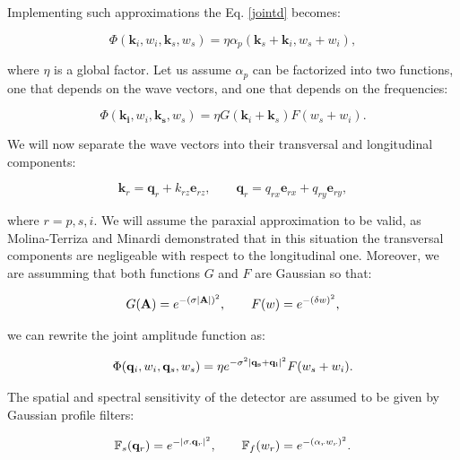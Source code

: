 \documentclass[12pt]{book}
\begin{document}
Implementing such approximations the Eq. \ref{jointd} becomes:

\begin{equation}
\Phi(\mathbf{k}_{i},w_{i},\mathbf{k}_{s},w_{s})= \eta \alpha_{p}(\mathbf{k}_{s}+\mathbf{k}_{i},w_{s}+w_{i}) ,
\end{equation}


where $\eta$ is a global factor. Let us assume  $\alpha_{p}$ can be factorized into two functions, one that depends on the wave vectors, and one that depends on the frequencies:

\begin{equation}
\Phi(\mathbf{k_{i}},w_{i},\mathbf{k_{s}},w_{s})= \eta G(\mathbf{k}_{i}+\mathbf{k}_{s}) F(w_{s}+w_{i}) .
\end{equation}
 
We  will now separate the wave vectors into their transversal and longitudinal components:

\begin{equation}
\mathbf{k}_{r}=\mathbf{q}_{r}+k_{rz} \mathbf{e}_{rz},\qquad \mathbf{q}_{r}=q_{rx} \mathbf{e}_{rx}+q_{ry} \mathbf{e}_{ry},
\end{equation}

where $r=p, s, i$. We will assume the paraxial approximation to be valid,  as Molina-Terriza and Minardi \cite{minardi} demonstrated that in this situation the transversal components are negligeable with respect to the longitudinal one. Moreover, we are assumming that both functions $G$ and $F$ are Gaussian so that:

\begin{equation}
G(\mathbf{A})=e^{- (\sigma \abs{\mathbf{A}})^{2} },\qquad F(w)=e^{-(\delta w)^2},
\end{equation}

we can rewrite the joint amplitude function as:

\begin{equation}
\Phi(\mathbf{q}_{i},w_{i},\mathbf{q}_{s},w_{s})= \eta e^{-\sigma^{2}\abs{\mathbf{q_{s}}+\mathbf{q_{i}}}^{2}} F(w_{s}+w_{i}).\label{true}
\end{equation}

The spatial and spectral sensitivity of the detector are assumed to be given by Gaussian profile filters:

\begin{equation}
\mathbb{F}_{s}(\mathbf{q}_{r})=e^{-\abs{\mathbf{\sigma}.\mathbf{q}_{r}}^{2}},\qquad \mathbb{F}_{f}(w_{r})=e^{-(\alpha_{r} w_{r})^{2}}. \label{filter}
\end{equation}
\end{document}
